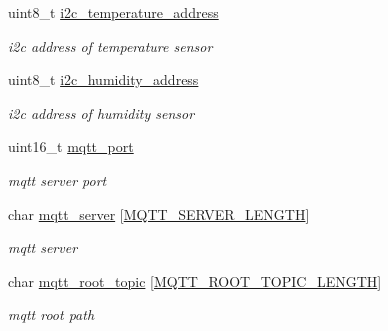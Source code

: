 \begin{DoxyCompactItemize}
\mbox{\label{structconfiguration__t_aed0a51c0dfbd925368c8539cf10c3001}} 
uint8\+\_\+t \hyperlink{structconfiguration__t_aed0a51c0dfbd925368c8539cf10c3001}{i2c\+\_\+temperature\+\_\+address}
\begin{DoxyCompactList}\small\item\em i2c address of temperature sensor \end{DoxyCompactList}\item 
\mbox{\label{structconfiguration__t_a79d1b1d9cb095c2bc0deb36c4f44452c}} 
uint8\+\_\+t \hyperlink{structconfiguration__t_a79d1b1d9cb095c2bc0deb36c4f44452c}{i2c\+\_\+humidity\+\_\+address}
\begin{DoxyCompactList}\small\item\em i2c address of humidity sensor \end{DoxyCompactList}\item 
\mbox{\label{structconfiguration__t_aa003a99852a65bd2f9de0d230568bbbf}} 
uint16\+\_\+t \hyperlink{structconfiguration__t_aa003a99852a65bd2f9de0d230568bbbf}{mqtt\+\_\+port}
\begin{DoxyCompactList}\small\item\em mqtt server port \end{DoxyCompactList}\item 
\mbox{\label{structconfiguration__t_ad9a71a593cd2191ed132f9a2d6c00679}} 
char \hyperlink{structconfiguration__t_ad9a71a593cd2191ed132f9a2d6c00679}{mqtt\+\_\+server} \mbox{[}\hyperlink{mqtt__config_8h_a0a37bcf35cdbfc63d72beca198759c08}{M\+Q\+T\+T\+\_\+\+S\+E\+R\+V\+E\+R\+\_\+\+L\+E\+N\+G\+TH}\mbox{]}
\begin{DoxyCompactList}\small\item\em mqtt server \end{DoxyCompactList}\item 
\mbox{\label{structconfiguration__t_acebf92623ad7bdf44f9707b0d99f50da}} 
char \hyperlink{structconfiguration__t_acebf92623ad7bdf44f9707b0d99f50da}{mqtt\+\_\+root\+\_\+topic} \mbox{[}\hyperlink{mqtt__config_8h_a6d3b5b0f9c41b605e608f7d460491be6}{M\+Q\+T\+T\+\_\+\+R\+O\+O\+T\+\_\+\+T\+O\+P\+I\+C\+\_\+\+L\+E\+N\+G\+TH}\mbox{]}
\begin{DoxyCompactList}\small\item\em mqtt root path \end{DoxyCompactList}\item 

\end{DoxyCompactItemize}
